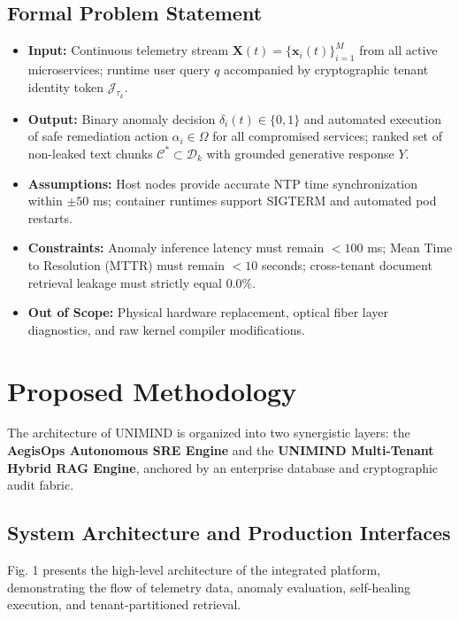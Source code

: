 \documentclass[12pt,onecolumn,draftclsnofoot]{IEEEtran}
\begin{document}
\subsection{Formal Problem Statement}
\begin{itemize}
    \item \textbf{Input:} Continuous telemetry stream $\mathbf{X}(t) = \{\mathbf{x}_i(t)\}_{i=1}^M$ from all active microservices; runtime user query $q$ accompanied by cryptographic tenant identity token $\mathcal{J}_{\tau_k}$.
    \item \textbf{Output:} Binary anomaly decision $\delta_i(t) \in \{0, 1\}$ and automated execution of safe remediation action $\alpha_i \in \Omega$ for all compromised services; ranked set of non-leaked text chunks $\mathcal{C}^* \subset \mathcal{D}_k$ with grounded generative response $Y$.
    \item \textbf{Assumptions:} Host nodes provide accurate NTP time synchronization within $\pm 50$ ms; container runtimes support SIGTERM and automated pod restarts.
    \item \textbf{Constraints:} Anomaly inference latency must remain $<100$ ms; Mean Time to Resolution (MTTR) must remain $<10$ seconds; cross-tenant document retrieval leakage must strictly equal $0.0\%$.
    \item \textbf{Out of Scope:} Physical hardware replacement, optical fiber layer diagnostics, and raw kernel compiler modifications.
\end{itemize}

\section{Proposed Methodology}

The architecture of UNIMIND is organized into two synergistic layers: the \textbf{AegisOps Autonomous SRE Engine} and the \textbf{UNIMIND Multi-Tenant Hybrid RAG Engine}, anchored by an enterprise database and cryptographic audit fabric.

\subsection{System Architecture and Production Interfaces}
Fig. 1 presents the high-level architecture of the integrated platform, demonstrating the flow of telemetry data, anomaly evaluation, self-healing execution, and tenant-partitioned retrieval.
\end{document}
